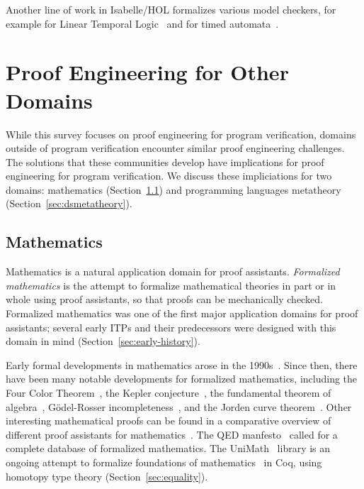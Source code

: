 Another line of work in Isabelle/HOL formalizes various model checkers, for example
for Linear Temporal Logic~\citep{esparza2013fully} and for timed automata~\citep{wimmer2018verified}.


\section{Proof Engineering for Other Domains}
\label{sec:other-domains}

While this survey focuses on proof engineering for program verification,
domains outside of program verification encounter similar proof engineering challenges.
The solutions that these communities develop have implications for proof engineering
for program verification. We discuss these impliciations for two domains:
mathematics (Section~\ref{sec:dsmathematics})
and programming languages metatheory (Section~\ref{sec:dsmetatheory}).

\subsection{Mathematics}
\label{sec:dsmathematics}


Mathematics is a natural application domain for proof assistants.
\textit{Formalized mathematics} is the attempt to formalize mathematical 
theories in part or in whole using proof assistants, so that proofs can be 
mechanically checked. 
Formalized mathematics was one of the first major application domains for proof assistants;
several early ITPs and their predecessors
were designed with this domain in mind (Section~\ref{sec:early-history}).

Early formal developments in mathematics arose in the 
1990s~\citep{zucker1994formalization, van1994checking, bancerek1990fundamental, qed-manifesto-boyer-cade94}.
Since then, there have been many notable developments for formalized mathematics,
including the Four Color Theorem~\citep{Gonthier2008}, the Kepler
conjecture~\citep{Hales2011, Hales2017}, the fundamental
theorem of algebra~\citep{Geuvers2000}, G{\"o}del-Rosser incompleteness~\citep{OConnor2005}, and the Jorden curve theorem~\citep{Hales2007}. %
Other interesting mathematical proofs can be found in a comparative overview of different proof assistants for mathematics~\citep{Wiedijk2006}.
The QED manfesto~\citep{qed-manifesto-boyer-cade94} called for a complete database of formalized mathematics.
The UniMath~\citep{UniMath} library is an ongoing attempt to formalize foundations of mathematics~\citep{Voevodsky2015}
in Coq, using homotopy type theory (Section~\ref{sec:equality}).


